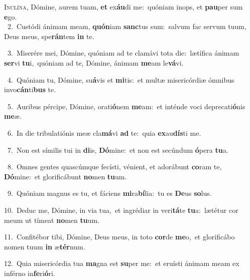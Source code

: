 \lettrine{\initial\textcolor{\initialcolor}{I}}{nclína,} Dómine, aurem tuam, \textbf{et} ex\-\textbf{áu}\-di me:~\star quóniam inops, et \textbf{pau}\-per sum \textbf{e}\-go.\\
{\numbfont\textcolor{\numbcolor}{~2.}}~Custódi ánimam meam, \textbf{quón}\-iam \textbf{sanc}\-tus sum:~\star salvum fac servum tuum, Deus meus, spe\-\textbf{rán}\-tem \textbf{in} te.\par
{\numbfont\textcolor{\numbcolor}{~3.}}~Miserére mei, Dómine, quóniam ad te clamávi tota die:~\dagger lætífica ánimam \textbf{ser}\-vi \textbf{tu}\-i,~\star quóniam ad te, Dómine, ánimam \textbf{me}\-am le\-\textbf{vá}\-vi.\par
{\numbfont\textcolor{\numbcolor}{~4.}}~Quóniam tu, Dómine, su\-\textbf{á}\-vis et \textbf{mi}\-tis:~\star et multæ misericórdiæ ómnibus invo\-\textbf{cán}\-ti\textbf{bus} te.\par
{\numbfont\textcolor{\numbcolor}{~5.}}~Auribus pércipe, Dómine, orati\-\textbf{ó}\-nem \textbf{me}\-am:~\star et inténde voci deprecati\-\textbf{ó}\-nis \textbf{me}\-æ.\par
{\numbfont\textcolor{\numbcolor}{~6.}}~In die tribulatiónis meæ cla\-\textbf{má}\-vi \textbf{ad} te:~\star quia \textbf{ex}\-au\-\textbf{dís}\-ti me.\par
{\numbfont\textcolor{\numbcolor}{~7.}}~Non est símilis tui in \textbf{di}\-is, \textbf{Dó}\-mine:~\star et non est secúndum \textbf{ó}\-pera \textbf{tu}\-a.\par
{\numbfont\textcolor{\numbcolor}{~8.}}~Omnes gentes quascúmque fecísti, vénient, et adorábunt \textbf{co}\-ram te, \textbf{Dó}\-mine:~\star et glorificábunt \textbf{no}\-men \textbf{tu}\-um.\par
{\numbfont\textcolor{\numbcolor}{~9.}}~Quóniam magnus es tu, et fáciens \textbf{mi}\-ra\-\textbf{bí}\-lia:~\star tu es \textbf{De}\-us \textbf{so}\-lus.\par
{\numbfont\textcolor{\numbcolor}{10.}}~Deduc me, Dómine, in via tua,~\dagger et ingrédiar in veri\-\textbf{tá}\-te \textbf{tu}\-a:~\star lætétur cor meum ut tímeat \textbf{no}\-men \textbf{tu}\-um.\par
{\numbfont\textcolor{\numbcolor}{11.}}~Confitébor tibi, Dómine, Deus meus, in toto \textbf{cor}\-de \textbf{me}\-o,~\star et glorificábo nomen tuum \textbf{in} æ\-\textbf{tér}\-num.\par
{\numbfont\textcolor{\numbcolor}{12.}}~Quia misericórdia tua \textbf{ma}\-gna est \textbf{su}\-per me:~\star et eruísti ánimam meam ex inférno in\-\textbf{fe}\-ri\-\textbf{ó}\-ri.\par
